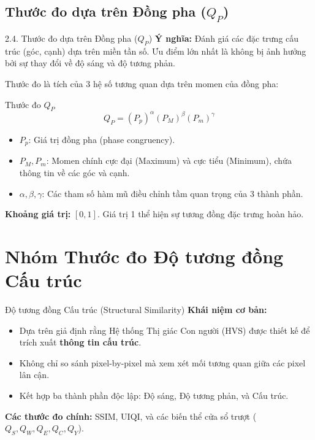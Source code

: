 \documentclass{beamer}
\begin{document}
\subsection{Thước đo dựa trên Đồng pha ($Q_P$)}
\begin{frame}{2.4. Thước đo dựa trên Đồng pha ($Q_P$)}
    \textbf{Ý nghĩa:} Đánh giá các đặc trưng cấu trúc (góc, cạnh) dựa trên miền tần số. Ưu điểm lớn nhất là không bị ảnh hưởng bởi sự thay đổi về độ sáng và độ tương phản.

    Thước đo là tích của 3 hệ số tương quan dựa trên momen của đồng pha:
    \begin{block}{Thước đo $Q_P$}
    \begin{equation}
        Q_P = (P_p)^\alpha (P_M)^\beta (P_m)^\gamma
    \end{equation}
    \end{block}

    \begin{itemize}
        \item $P_p$: Giá trị đồng pha (phase congruency).
        \item $P_M, P_m$: Momen chính cực đại (Maximum) và cực tiểu (Minimum), chứa thông tin về các góc và cạnh.
        \item $\alpha, \beta, \gamma$: Các tham số hàm mũ điều chỉnh tầm quan trọng của 3 thành phần.
    \end{itemize}

    \vspace{0.3cm}
    \textbf{Khoảng giá trị:} $[0, 1]$. Giá trị 1 thể hiện sự tương đồng đặc trưng hoàn hảo.
\end{frame}


\section{Nhóm Thước đo Độ tương đồng Cấu trúc}

\begin{frame}{Độ tương đồng Cấu trúc (Structural Similarity)}
    \textbf{Khái niệm cơ bản:}
    \begin{itemize}
        \item Dựa trên giả định rằng Hệ thống Thị giác Con người (HVS) được thiết kế để trích xuất \textbf{thông tin cấu trúc}.
        \item Không chỉ so sánh pixel-by-pixel mà xem xét mối tương quan giữa các pixel lân cận.
        \item Kết hợp ba thành phần độc lập: Độ sáng, Độ tương phản, và Cấu trúc.
    \end{itemize}
    
    \vspace{0.4cm}
    \textbf{Các thước đo chính:} SSIM, UIQI, và các biến thể cửa sổ trượt ($Q_S, Q_W, Q_E, Q_C, Q_Y$).
\end{frame}
\end{document}
